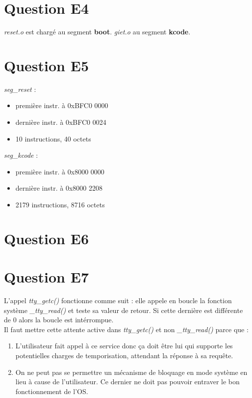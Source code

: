 \documentclass[10pt]{article}
\begin{document}
\section{Question E4}
{\it reset.o} est chargé au segment {\bf boot}. {\it giet.o} au segment {\bf kcode}.

\newpage

\section{Question E5}
{\it seg\_reset} :
\begin{itemize}
  \item première instr. à 0xBFC0 0000
  \item dernière instr. à 0xBFC0 0024
  \item 10 instructions, 40 octets
\end{itemize}
{\it seg\_kcode} :
\begin{itemize}
  \item première instr. à 0x8000 0000
  \item dernière instr. à 0x8000 2208
  \item 2179 instructions, 8716 octets
\end{itemize}

\section{Question E6}


\section{Question E7}
L'appel {\it tty\_getc()} fonctionne comme suit : elle appele en boucle la fonction
système {\it \_tty\_read()} et teste sa valeur de retour. Si cette dernière est
différente de 0 alors la boucle est intérrompue.\\
Il faut mettre cette attente active dans {\it tty\_getc()} et non {\it \_tty\_read()}
parce que :
\begin{enumerate}
  \item L'utilisateur fait appel à ce service donc ça doit être lui qui supporte
  les potentielles charges de temporisation, attendant la réponse à sa requête.
  \item On ne peut pas se permettre un mécanisme de bloquage en mode système
  en lieu à cause de l'utilisateur. Ce dernier ne doit pas pouvoir entraver le
  bon fonctionnement de l'OS.
\end{enumerate}
\end{document}

